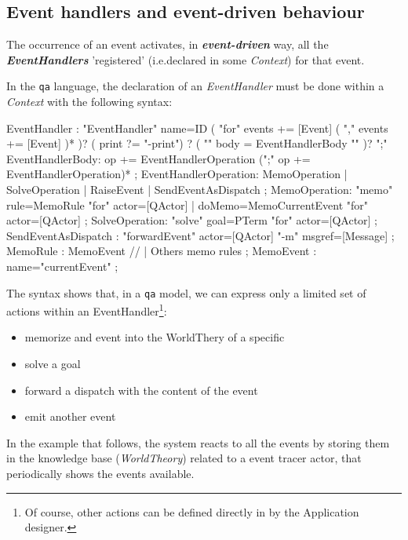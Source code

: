 \subsection{Event handlers and event-driven behaviour }
The occurrence of an event activates, in \textit{\textbf{event-driven}} way, all the \textbf{\textit{EventHandlers}} 'registered' (i.e.declared in some \textit{Context}) for that event. 
  
In the \texttt{qa} language, the declaration of an \textit{EventHandler} must be done within a \textit{Context} with the following syntax: 

\begin{javacode}  
EventHandler :  
 	"EventHandler" name=ID   ( "for" events += [Event] ( "," events += [Event] )* )? 
 	( print ?= "-print") ?
 	( "{"  body = EventHandlerBody "}" )?
 	";" 
EventHandlerBody:
	 op += EventHandlerOperation (";" op += EventHandlerOperation)* 
;
EventHandlerOperation:
	MemoOperation | SolveOperation | RaiseEvent | SendEventAsDispatch
;
MemoOperation:
	"memo" rule=MemoRule "for" actor=[QActor]
	| doMemo=MemoCurrentEvent "for" actor=[QActor]
;
SolveOperation:
	"solve" goal=PTerm "for" actor=[QActor]
;
SendEventAsDispatch :
	"forwardEvent" actor=[QActor] "-m" msgref=[Message]
; 
MemoRule :
	MemoEvent //  | Others memo rules
;
MemoEvent :
	name="currentEvent"
; 	
\end{javacode}

The syntax shows that, in a \texttt{qa} model, we can express only a limited set of actions within an EventHandler\footnote{Of course, other actions can be defined directly in \java{} by the Application designer.}:

\begin{itemize}
\item memorize and event into the WorldThery of a specific \qa{}
\item solve a goal
\item forward a dispatch with the content of the event
\item emit another event
\end{itemize}

In the example that follows, the system reacts to all the events by storing them in the knowledge base (\textit{WorldTheory}) related to a event tracer actor, that periodically shows the events available.

  


